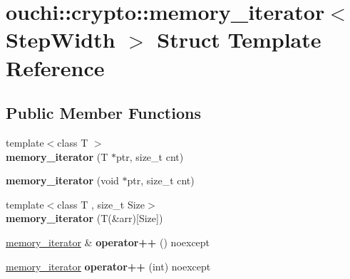 \hypertarget{structouchi_1_1crypto_1_1memory__iterator}{}\section{ouchi\+::crypto\+::memory\+\_\+iterator$<$ Step\+Width $>$ Struct Template Reference}
\label{structouchi_1_1crypto_1_1memory__iterator}
\subsection*{Public Member Functions}
\begin{DoxyCompactItemize}
\item 
\mbox{\label{structouchi_1_1crypto_1_1memory__iterator_a59cad2c857ba28d241b70ed12e11ffa2}} 
{\footnotesize template$<$class T $>$ }\\{\bfseries memory\+\_\+iterator} (T $\ast$ptr, size\+\_\+t cnt)
\item 
\mbox{\label{structouchi_1_1crypto_1_1memory__iterator_a460d67b419736d804e948672519c9c56}} 
{\bfseries memory\+\_\+iterator} (void $\ast$ptr, size\+\_\+t cnt)
\item 
\mbox{\label{structouchi_1_1crypto_1_1memory__iterator_abb76e30a4883da493202d4f4c595847d}} 
{\footnotesize template$<$class T , size\+\_\+t Size$>$ }\\{\bfseries memory\+\_\+iterator} (T(\&arr)\mbox{[}Size\mbox{]})
\item 
\mbox{\label{structouchi_1_1crypto_1_1memory__iterator_aea3d753ee2441da6c3af6077d2bb9b80}} 
\mbox{\hyperlink{structouchi_1_1crypto_1_1memory__iterator}{memory\+\_\+iterator}} \& {\bfseries operator++} () noexcept
\item 
\mbox{\label{structouchi_1_1crypto_1_1memory__iterator_aa4c801541ebaa4df285805b016442cf5}} 
\mbox{\hyperlink{structouchi_1_1crypto_1_1memory__iterator}{memory\+\_\+iterator}} {\bfseries operator++} (int) noexcept
\item 
\mbox{\label{structouchi_1_1crypto_1_1memory__iterator_a39a730bdfbef0d1f27d7a08a0a4ebb2a}} 

\end{DoxyCompactItemize}
